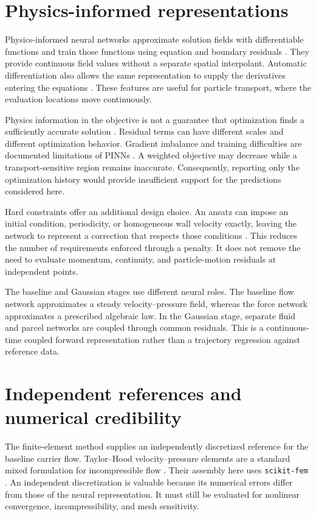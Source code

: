 \section{Physics-informed representations}
Physics-informed neural networks approximate solution fields with
differentiable functions and train those functions using equation and
boundary residuals \citep{raissi2019,lu2021,cai2021}. %
 They provide continuous field values
without a separate spatial interpolant. Automatic differentiation also
allows the same representation to supply the derivatives entering the
equations \citep{baydin2018}. These features are useful for particle transport, %
 where the
evaluation locations move continuously.

Physics information in the objective is not a guarantee that optimization
finds a sufficiently accurate solution \citep{krishnapriyan2021}. %
 Residual terms can have different
scales and different optimization behavior. Gradient imbalance and training
difficulties are documented limitations of PINNs
\citep{wang2021,wang2022}. A weighted objective may decrease while a
transport-sensitive region remains inaccurate. Consequently, reporting only
the optimization history would provide insufficient support for the
predictions considered here.

Hard constraints offer an additional design choice. An ansatz can impose an
initial condition, periodicity, or homogeneous wall velocity exactly, leaving
the network to represent a correction that respects those conditions
\citep{lagaris1998,sukumar2022}. %
 This
reduces the number of requirements enforced through a penalty. It does not
remove the need to evaluate momentum, continuity, and particle-motion
residuals at independent points.

The baseline and Gaussian stages use different neural roles. The baseline
flow network approximates a steady velocity--pressure field, whereas the
force network approximates a prescribed algebraic law. In the Gaussian
stage, separate fluid and parcel networks are coupled through common
residuals. This is a continuous-time coupled forward representation rather
than a trajectory regression against reference data.

\section{Independent references and numerical credibility}
The finite-element method supplies an independently discretized reference
for the baseline carrier flow. Taylor--Hood velocity--pressure elements are
a standard mixed formulation for incompressible flow \citep{taylor1973}.
Their assembly here uses \texttt{scikit-fem} \citep{gustafsson2020}. An
independent discretization is valuable because its numerical errors differ
from those of the neural representation. It must still be evaluated for
nonlinear convergence, incompressibility, and mesh sensitivity.

